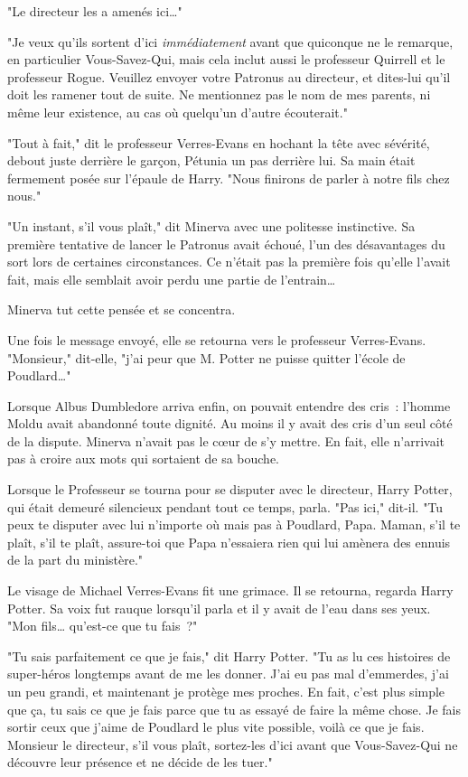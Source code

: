 "Le directeur les a amenés ici…"

"Je veux qu'ils sortent d'ici \emph{immédiatement} avant que quiconque ne le remarque, en particulier Vous-Savez-Qui, mais cela inclut aussi le professeur Quirrell et le professeur Rogue. Veuillez envoyer votre Patronus au directeur, et dites-lui qu'il doit les ramener tout de suite. Ne mentionnez pas le nom de mes parents, ni même leur existence, au cas où quelqu'un d'autre écouterait."

"Tout à fait," dit le professeur Verres-Evans en hochant la tête avec sévérité, debout juste derrière le garçon, Pétunia un pas derrière lui. Sa main était fermement posée sur l'épaule de Harry. "Nous finirons de parler à notre fils chez nous."

"Un instant, s'il vous plaît," dit Minerva avec une politesse instinctive. Sa première tentative de lancer le Patronus avait échoué, l'un des désavantages du sort lors de certaines circonstances. Ce n'était pas la première fois qu'elle l'avait fait, mais elle semblait avoir perdu une partie de l'entrain…

Minerva tut cette pensée et se concentra.

Une fois le message envoyé, elle se retourna vers le professeur Verres-Evans. "Monsieur," dit-elle, "j'ai peur que M. Potter ne puisse quitter l'école de Poudlard…"

Lorsque Albus Dumbledore arriva enfin, on pouvait entendre des cris~: l'homme Moldu avait abandonné toute dignité. Au moins il y avait des cris d'un seul côté de la dispute. Minerva n'avait pas le cœur de s'y mettre. En fait, elle n'arrivait pas à croire aux mots qui sortaient de sa bouche.

Lorsque le Professeur se tourna pour se disputer avec le directeur, Harry Potter, qui était demeuré silencieux pendant tout ce temps, parla. "Pas ici," dit-il. "Tu peux te disputer avec lui n'importe où mais pas à Poudlard, Papa. Maman, s'il te plaît, s'il te plaît, assure-toi que Papa n'essaiera rien qui lui amènera des ennuis de la part du ministère."

Le visage de Michael Verres-Evans fit une grimace. Il se retourna, regarda Harry Potter. Sa voix fut rauque lorsqu'il parla et il y avait de l'eau dans ses yeux. "Mon fils… qu'est-ce que tu fais~?"

"Tu sais parfaitement ce que je fais," dit Harry Potter. "Tu as lu ces histoires de super-héros longtemps avant de me les donner. J'ai eu pas mal d'emmerdes, j'ai un peu grandi, et maintenant je protège mes proches. En fait, c'est plus simple que ça, tu sais ce que je fais parce que tu as essayé de faire la même chose. Je fais sortir ceux que j'aime de Poudlard le plus vite possible, voilà ce que je fais. Monsieur le directeur, s'il vous plaît, sortez-les d'ici avant que Vous-Savez-Qui ne découvre leur présence et ne décide de les tuer."

